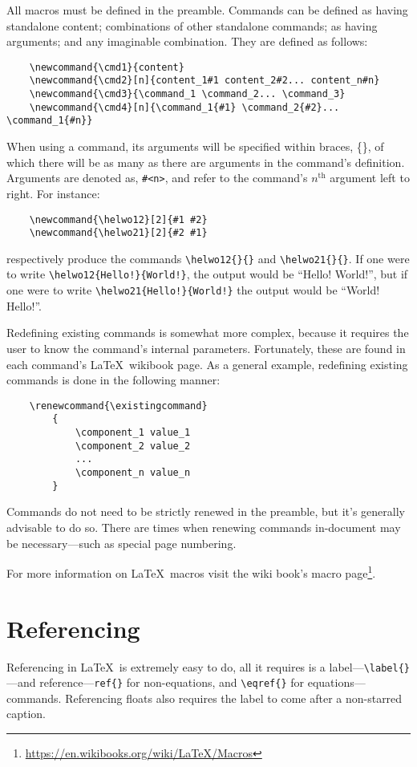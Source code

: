 All macros must be defined in the preamble.  Commands can be defined
as having standalone content; combinations of other standalone
commands; as having arguments; and any imaginable combination. They
are defined as follows:
\begin{verbatim}
	\newcommand{\cmd1}{content}
	\newcommand{\cmd2}[n]{content_1#1 content_2#2... content_n#n}
	\newcommand{\cmd3}{\command_1 \command_2... \command_3}
	\newcommand{\cmd4}[n]{\command_1{#1} \command_2{#2}... \command_1{#n}}
\end{verbatim}
When using a command, its arguments will be specified within braces,
\{\}, of which there will be as many as there are arguments in the
command's definition. Arguments are denoted as, \verb|#<n>|, and refer
to the command's $n^{\text{th}}$ argument left to right.  For
instance:
\begin{verbatim}
	\newcommand{\helwo12}[2]{#1 #2}
	\newcommand{\helwo21}[2]{#2 #1}
\end{verbatim}
respectively produce the commands \verb|\helwo12{}{}| and
\verb|\helwo21{}{}|.  If one were to write
\verb|\helwo12{Hello!}{World!}|, the output would be ``Hello!
World!'', but if one were to write \verb|\helwo21{Hello!}{World!}| the
output would be ``World! Hello!''.

Redefining existing commands is somewhat more complex, because it
requires the user to know the command's internal parameters.
Fortunately, these are found in each command's \LaTeX~wikibook page.
As a general example, redefining existing commands is done in the
following manner:
\begin{verbatim}
	\renewcommand{\existingcommand}
	    {
	        \component_1 value_1
	        \component_2 value_2
	        ...
	        \component_n value_n
	    }
\end{verbatim}
Commands do not need to be strictly renewed in the preamble, but it's
generally advisable to do so.  There are times when renewing commands
in-document may be necessary---such as special page numbering.

For more information on \LaTeX~macros visit the wiki book's macro
page\footnote{\url{https://en.wikibooks.org/wiki/LaTeX/Macros}}.
%
\section{Referencing}
%
Referencing in \LaTeX~is extremely easy to do, all it requires is a
label---\verb|\label{}|---and reference---\verb|ref{}| for
non-equations, and \verb|\eqref{}| for
equations---commands.  Referencing floats also requires the label to
come after a non-starred caption.

